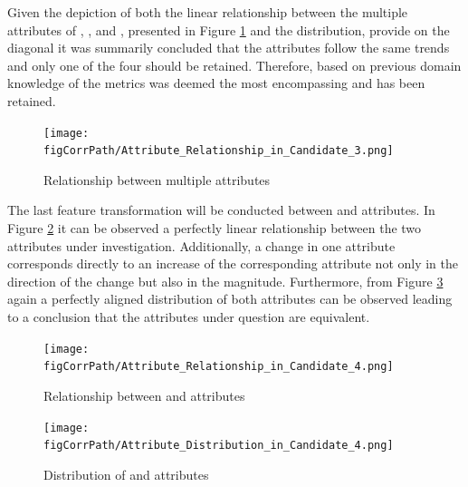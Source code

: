 \begin{enumerate}
Given the depiction of both the linear relationship between the multiple  attributes of \overallCoverage{}, \overallLineCoverage{},\coverage{} and \lineCoverage{}, presented in Figure \ref{fig:candidate3-pairplot} and the distribution, provide on the diagonal it was summarily concluded that the attributes follow the same trends and only one of the four should be retained. Therefore, based on previous domain knowledge of the metrics \overallCoverage{} was deemed the most encompassing and has been retained.
\begin{figure}[!h]
    \centering
    \texttt{[image: \\figCorrPath/Attribute\_Relationship\_in\_Candidate\_3.png]}
    \caption{Relationship between multiple attributes}
    \label{fig:candidate3-pairplot}
\end{figure}

\FloatBarrier

The last feature transformation will be conducted between \overallUncoveredConditions{} and \uncoveredConditions{} attributes. In Figure \ref{fig:candidate4-scatterplot} it can be observed a perfectly linear relationship between the two attributes under investigation. Additionally, a change in one attribute corresponds directly to an increase of the corresponding attribute not only in the direction of the change but also in the magnitude. Furthermore, from Figure \ref{fig:candidate4-distribution} again a perfectly aligned distribution of both attributes can be observed leading to a conclusion that the attributes under question are equivalent.

\begin{figure}[!h]
    \centering
    \texttt{[image: \\figCorrPath/Attribute\_Relationship\_in\_Candidate\_4.png]}
    \caption{Relationship between \overallUncoveredConditions{} and \uncoveredConditions{} attributes}
    \label{fig:candidate4-scatterplot}
\end{figure}

\begin{figure}[!h]
    \centering
    \texttt{[image: \\figCorrPath/Attribute\_Distribution\_in\_Candidate\_4.png]}
    \caption{Distribution of \overallUncoveredConditions{} and \uncoveredConditions{} attributes}
    \label{fig:candidate4-distribution}
\end{figure}


\end{enumerate}
